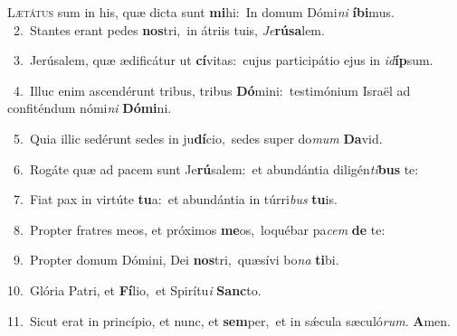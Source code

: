 \lettrine{\initial\textcolor{\initialcolor}{L}}{ætátus} sum in his, quæ dicta sunt \textbf{mi}\-hi:~\star In domum Dómi\textit{ni} \textbf{í}\-\textbf{bi}mus.\\
{\numbfont\textcolor{\numbcolor}{~2.}}~Stantes erant pedes \textbf{nos}\-tri,~\star in átriis tuis, \textit{Je}\-\textbf{rú}\textbf{sa}lem.\par
{\numbfont\textcolor{\numbcolor}{~3.}}~Jerúsalem, quæ ædificátur ut \textbf{cí}\-vitas:~\star cujus participátio ejus in \textit{id}\-\textbf{íp}sum.\par
{\numbfont\textcolor{\numbcolor}{~4.}}~Illuc enim ascendérunt tribus, tribus \textbf{Dó}\-mini:~\star testimónium Israël ad confiténdum nómi\textit{ni} \textbf{Dó}\-\textbf{mi}ni.\par
{\numbfont\textcolor{\numbcolor}{~5.}}~Quia illic sedérunt sedes in ju\-\textbf{dí}\-cio,~\star sedes super do\textit{mum} \textbf{Da}\-vid.\par
{\numbfont\textcolor{\numbcolor}{~6.}}~Rogáte quæ ad pacem sunt Je\-\textbf{rú}\-salem:~\star et abundántia diligén\-\textit{ti}\-\textbf{bus} te:\par
{\numbfont\textcolor{\numbcolor}{~7.}}~Fiat pax in virtúte \textbf{tu}\-a:~\star et abundántia in túrri\textit{bus} \textbf{tu}\-is.\par
{\numbfont\textcolor{\numbcolor}{~8.}}~Propter fratres meos, et próximos \textbf{me}\-os,~\star loquébar pa\textit{cem} \textbf{de} te:\par
{\numbfont\textcolor{\numbcolor}{~9.}}~Propter domum Dómini, Dei \textbf{nos}\-tri,~\star quæsívi bo\textit{na} \textbf{ti}\-bi.\par
{\numbfont\textcolor{\numbcolor}{10.}}~Glória Patri, et \textbf{Fí}\-lio,~\star et Spirítu\textit{i} \textbf{Sanc}\-to.\par
{\numbfont\textcolor{\numbcolor}{11.}}~Sicut erat in princípio, et nunc, et \textbf{sem}\-per,~\star et in sǽcula sæculó\-\textit{rum}\-. \textbf{A}\-men.\par

